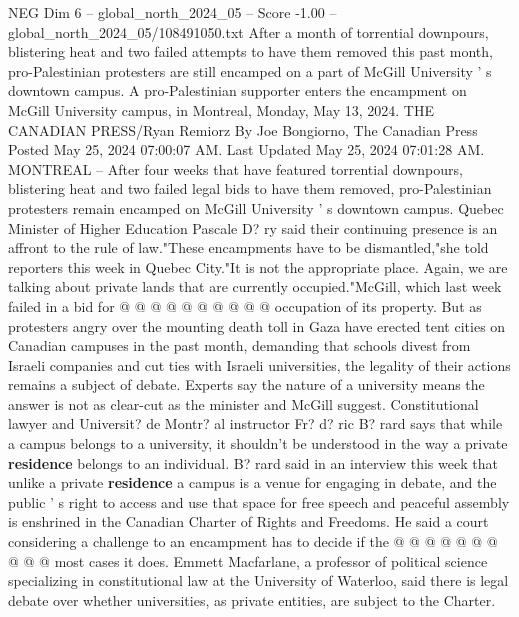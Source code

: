 \begin{textsample}{NEG Dim 6 – global\_north\_2024\_05 – Score -1.00 – global\_north\_2024\_05/108491050.txt}  \label{ex:f6_neg_289}
After a month of torrential downpours, blistering heat and two failed attempts to have them removed this past month, pro-Palestinian protesters are still encamped on a part of McGill University ' s downtown campus.
A pro-Palestinian supporter enters the encampment on McGill University campus, in Montreal, Monday, May 13, 2024.
THE CANADIAN PRESS/Ryan Remiorz By Joe Bongiorno, The Canadian Press Posted May 25, 2024 07:00:07 AM.
Last Updated May 25, 2024 07:01:28 AM.
MONTREAL -- After four weeks that have featured torrential downpours, blistering heat and two failed legal bids to have them removed, pro-Palestinian protesters remain encamped on McGill University ' s downtown campus.
Quebec Minister of Higher Education Pascale D? ry said their continuing presence is an affront to the rule of law."These encampments have to be dismantled,"she told reporters this week in Quebec City."It is not the appropriate place.
Again, we are talking about private lands that are currently occupied."McGill, which last week failed in a bid for @ @ @ @ @ @ @ @ @ @ occupation of its property.
But as protesters angry over the mounting death toll in Gaza have erected tent cities on Canadian campuses in the past month, demanding that schools divest from Israeli companies and cut ties with Israeli universities, the legality of their actions remains a subject of debate.
Experts say the nature of a university means the answer is not as clear-cut as the minister and McGill suggest.
Constitutional lawyer and Universit? de Montr? al instructor Fr? d? ric B? rard says that while a campus belongs to a university, it shouldn't be understood in the way a private \textbf{residence} belongs to an individual.
B? rard said in an interview this week that unlike a private \textbf{residence} a campus is a venue for engaging in debate, and the public ' s right to access and use that space for free speech and peaceful assembly is enshrined in the Canadian Charter of Rights and Freedoms.
He said a court considering a challenge to an encampment has to decide if the @ @ @ @ @ @ @ @ @ @ most cases it does.
Emmett Macfarlane, a professor of political science specializing in constitutional law at the University of Waterloo, said there is legal debate over whether universities, as private entities, are subject to the Charter.

\end{textsample}
